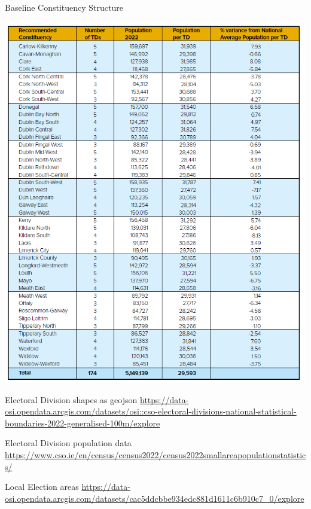 \documentclass[runningheads]{llncs}
\begin{document}
\begin{table}[htbp]
\caption{\label{tab:baselinetable}Baseline Constituency Structure}
\includegraphics[width=\textwidth]{images/baselinetable}
\end{table}


Electoral Division shapes as geojson
\url{https://data-osi.opendata.arcgis.com/datasets/osi::cso-electoral-divisions-national-statistical-boundaries-2022-generalised-100m/explore}

Electoral Division population data
\url{https://www.cso.ie/en/census/census2022/census2022smallareapopulationstatistics/}

Local Election areas
\url{https://data-osi.opendata.arcgis.com/datasets/cac5ddcbbe934edc881d1611c6b910c7_0/explore}
\end{document}
